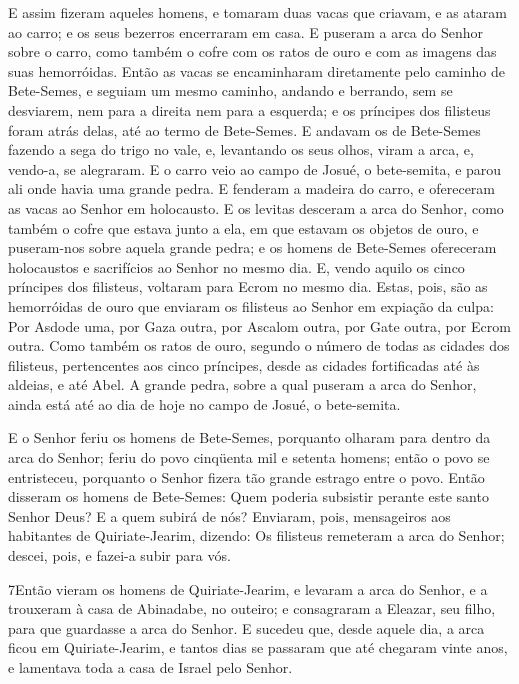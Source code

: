 E assim fizeram aqueles homens, e tomaram duas vacas que criavam,
e as ataram ao carro; e os seus bezerros encerraram em casa.
E puseram a arca do Senhor sobre o carro, como também o cofre
com os ratos de ouro e com as imagens das suas hemorróidas.
Então as vacas se encaminharam diretamente pelo caminho de
Bete-Semes, e seguiam um mesmo caminho, andando e berrando, sem se
desviarem, nem para a direita nem para a esquerda; e os príncipes
dos filisteus foram atrás delas, até ao termo de Bete-Semes.
E andavam os de Bete-Semes fazendo a sega do trigo no vale,
e, levantando os seus olhos, viram a arca, e, vendo-a, se alegraram.
E o carro veio ao campo de Josué, o bete-semita, e parou ali
onde havia uma grande pedra. E fenderam a madeira do carro, e
ofereceram as vacas ao Senhor em holocausto. E os levitas
desceram a arca do Senhor, como também o cofre que estava junto a
ela, em que estavam os objetos de ouro, e puseram-nos sobre aquela
grande pedra; e os homens de Bete-Semes ofereceram holocaustos e
sacrifícios ao Senhor no mesmo dia. E, vendo aquilo os cinco
príncipes dos filisteus, voltaram para Ecrom no mesmo dia.
Estas, pois, são as hemorróidas de ouro que enviaram os
filisteus ao Senhor em expiação da culpa: Por Asdode uma, por Gaza
outra, por Ascalom outra, por Gate outra, por Ecrom outra.
Como também os ratos de ouro, segundo o número de todas as
cidades dos filisteus, pertencentes aos cinco príncipes, desde as
cidades fortificadas até às aldeias, e até Abel. A grande pedra,
sobre a qual puseram a arca do Senhor, ainda está até ao dia de hoje
no campo de Josué, o bete-semita.

E o Senhor feriu os homens de Bete-Semes, porquanto olharam para
dentro da arca do Senhor; feriu do povo cinqüenta mil e setenta
homens; então o povo se entristeceu, porquanto o Senhor fizera tão
grande estrago entre o povo. Então disseram os homens de
Bete-Semes: Quem poderia subsistir perante este santo Senhor Deus? E
a quem subirá de nós? Enviaram, pois, mensageiros aos
habitantes de Quiriate-Jearim, dizendo: Os filisteus remeteram a
arca do Senhor; descei, pois, e fazei-a subir para vós.

\medskip

\lettrine{7} Então vieram os homens de Quiriate-Jearim, e
levaram a arca do Senhor, e a trouxeram à casa de Abinadabe, no
outeiro; e consagraram a Eleazar, seu filho, para que guardasse a
arca do Senhor. E sucedeu que, desde aquele dia, a arca ficou em
Quiriate-Jearim, e tantos dias se passaram que até chegaram vinte
anos, e lamentava toda a casa de Israel pelo Senhor.

